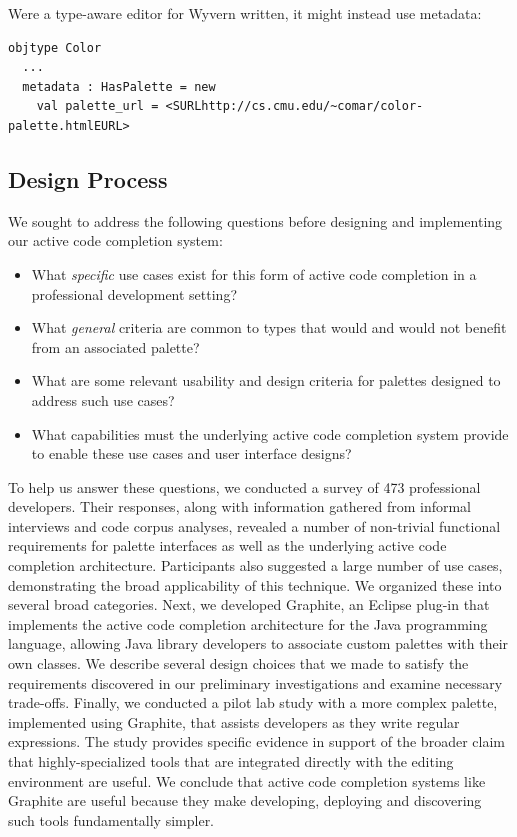 Were a type-aware editor for Wyvern written, it might instead use metadata:
\begin{lstlisting}
objtype Color
  ...
  metadata : HasPalette = new
    val palette_url = <SURLhttp://cs.cmu.edu/~comar/color-palette.htmlEURL>
\end{lstlisting}

\subsection{Design Process}
We sought to address the following questions before designing and implementing our active code completion system:

\begin{itemize}
\item What {\it specific} use cases exist for this form of active code completion in a professional development setting? 
\item What {\it general} criteria are common to types that would and would not benefit from an associated palette?
\item What are some relevant usability and design criteria for palettes designed to address such use cases?
\item What capabilities must the underlying active code completion system provide to enable these use cases and user interface designs?
\end{itemize}

To help us answer these questions, we conducted a survey of 473 professional developers. Their responses, along with information gathered from informal interviews and code corpus analyses, revealed a number of non-trivial functional requirements for palette interfaces as well as the underlying active code completion architecture. Participants also suggested a large number of use cases, demonstrating the broad applicability of this technique. We organized these into several broad categories. Next, we developed Graphite, an Eclipse plug-in that implements the active code completion architecture for the Java programming language, allowing Java library developers to associate custom palettes with their own classes. We describe several design choices that we made to satisfy the requirements discovered in our preliminary investigations and examine necessary trade-offs. Finally, we conducted a pilot lab study with a more complex palette, implemented using Graphite, that assists developers as they write regular expressions. The study provides specific evidence in support of the broader claim that highly-specialized tools that are integrated directly with the editing environment are  useful. We conclude that active code completion systems like Graphite are useful because they make developing, deploying and discovering such tools fundamentally simpler.

